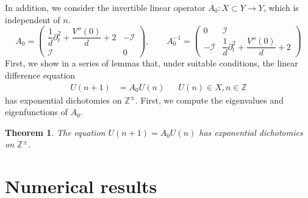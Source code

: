 \documentclass[12pt,reqno]{amsart}
\def\Z{{\mathbb Z}}
\def\id{{\mathcal I}}
\newtheorem{theorem}{Theorem}
\begin{document}
In addition, we consider the invertible linear operator $A_0: X \subset Y \rightarrow Y$, which is independent of $n$.
\begin{equation}\label{eq:A0}
A_0 = \begin{pmatrix}
\dfrac{1}{d}\partial_t^2 + \dfrac{V''(0)}{d} + 2 & -\id \\ \id & 0
\end{pmatrix}, \qquad
A_0^{-1} = \begin{pmatrix}
0 & \id \\ -\id & \dfrac{1}{d}\partial_t^2 + \dfrac{V''(0)}{d} + 2
\end{pmatrix}
\end{equation}
First, we show in a series of lemmas that, under suitable conditions, the linear difference equation
\begin{align}\label{eq:diffeq0}
U(n+1) &= A_0 U(n) && U(n) \in X, n \in \Z
\end{align}
has exponential dichotomies on $\Z^\pm$. First, we compute the eigenvalues and eigenfunctions of $A_0$.

\begin{theorem}The equation $U(n+1) = A_0 U(n)$ has exponential dichotomies on $\Z^\pm$.
\end{theorem}

\section{Numerical results}
\end{document}
